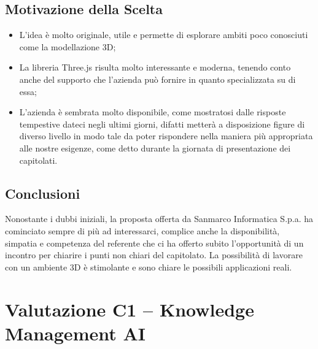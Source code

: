 \documentclass[a4paper, twoside]{article}
\begin{document}
    \subsection{Motivazione della Scelta}
        \begin{itemize}
            \item L'idea è molto originale, utile e permette di
            esplorare ambiti poco conosciuti come la modellazione 3D;
            \item La libreria Three.js risulta molto interessante e moderna,
            tenendo conto anche del supporto che l'azienda può fornire in quanto
            specializzata su di essa;
            \item L'azienda è sembrata molto disponibile, come mostratosi dalle
            risposte tempestive dateci negli ultimi giorni, difatti metterà a
            disposizione figure di diverso livello in modo tale da poter
            rispondere nella maniera più appropriata alle nostre esigenze, come
            detto durante la giornata di presentazione dei capitolati.
        \end{itemize}

    \subsection{Conclusioni}
        Nonostante i dubbi iniziali, la proposta offerta da Sanmarco Informatica
        S.p.a. ha cominciato sempre di più ad interessarci, complice anche la
        disponibilità, simpatia e competenza del referente che ci ha offerto
        subito l'opportunità di un incontro per chiarire i punti non chiari del
        capitolato. La possibilità di lavorare con un ambiente 3D è stimolante e
        sono chiare le possibili applicazioni reali.

        \section{Valutazione C1 -- Knowledge Management AI}
\end{document}
